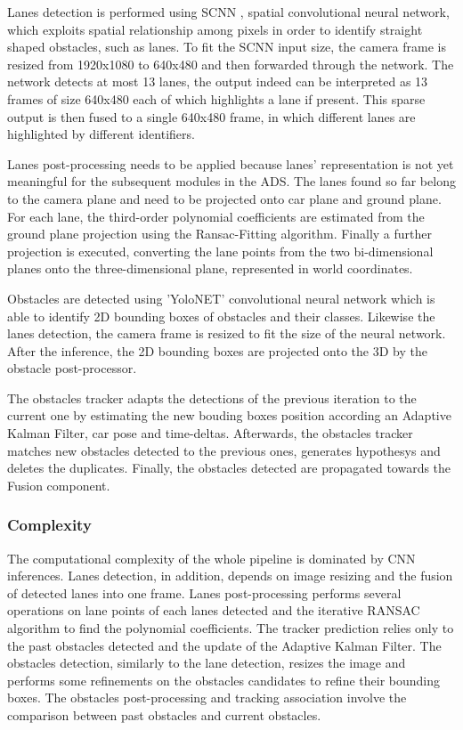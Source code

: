 \documentclass[conference]{IEEEtran}
\begin{document}
Lanes detection is performed using SCNN \cite{b2}, spatial convolutional neural network, which exploits spatial relationship among pixels in order to identify straight shaped obstacles, such as lanes.
To fit the SCNN input size, the camera frame is resized from 1920x1080 to 640x480 and then forwarded through the network.
The network detects at most 13 lanes, the output indeed can be interpreted as 13 frames of size 640x480 each of which highlights a lane if present. 
This sparse output is then fused to a single 640x480 frame, in which different lanes are highlighted by different identifiers.

Lanes post-processing needs to be applied because lanes' representation is not yet meaningful for the subsequent modules in the ADS.
The lanes found so far belong to the camera plane and need to be projected onto car plane and ground plane.
For each lane, the third-order polynomial coefficients are estimated from the ground plane projection using the Ransac-Fitting algorithm.
Finally a further projection is executed, converting the lane points from the two bi-dimensional planes onto the three-dimensional plane, represented in world coordinates.

Obstacles are detected using 'YoloNET' convolutional neural network which is able to identify 2D bounding boxes of obstacles and their classes.
Likewise the lanes detection, the camera frame is resized to fit the size of the neural network. After the inference, the 2D bounding boxes are projected onto the 3D by the obstacle post-processor.

The obstacles tracker adapts the detections of the previous iteration to the current one by estimating the new bouding boxes position according an Adaptive Kalman Filter, car pose and time-deltas.
Afterwards, the obstacles tracker matches new obstacles detected to the previous ones, generates hypothesys and deletes the duplicates.
Finally, the obstacles detected are propagated towards the Fusion component.

\subsubsection*{Complexity}

The computational complexity of the whole pipeline is dominated by CNN inferences.
Lanes detection, in addition, depends on image resizing and the fusion of detected lanes into one frame.
Lanes post-processing performs several operations on lane points of each lanes detected and the iterative RANSAC algorithm to find the polynomial coefficients.
The tracker prediction relies only to the past obstacles detected and the update of the Adaptive Kalman Filter.
The obstacles detection, similarly to the lane detection, resizes the image and performs some refinements on the obstacles candidates to refine their bounding boxes.
The obstacles post-processing and tracking association involve the comparison between past obstacles and current obstacles.
\end{document}
